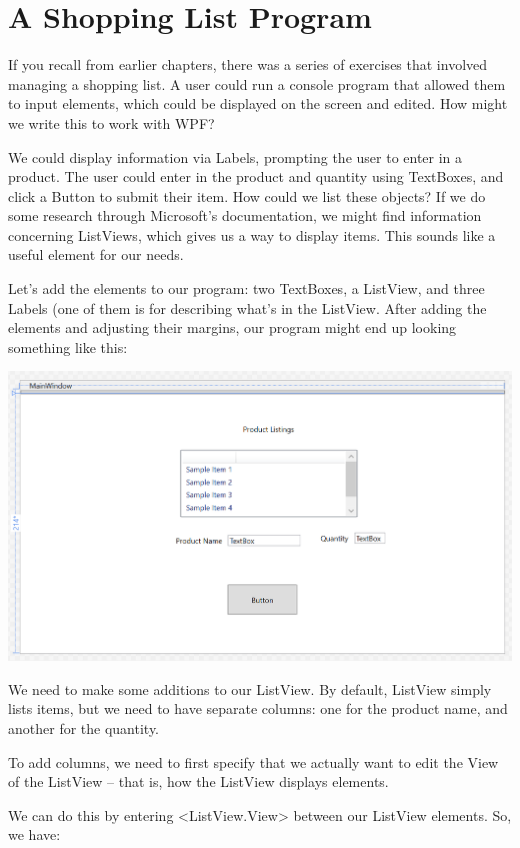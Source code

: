 \documentclass[oneside, openany] {book}
\begin{document}
\section{A Shopping List Program}
If you recall from earlier chapters, there was a series of exercises that involved managing a shopping list. A user could run a console program that allowed them to input elements, which could be displayed on the screen and edited. How might we write this to work with WPF?

We could display information via Labels, prompting the user to enter in a product. The user could enter in the product and quantity using TextBoxes, and click a Button to submit their item. How could we list these objects? If we do some research through Microsoft's documentation, we might find information concerning ListViews, which gives us a way to display items. This sounds like a useful element for our needs.

Let's add the elements to our program: two TextBoxes, a ListView, and three Labels (one of them is for describing what's in the ListView.
After adding the elements and adjusting their margins, our program might end up looking something like this:


\includegraphics[scale=0.3]{shoppingwpfintro.png}



We need to make some additions to our ListView. By default, ListView simply lists items, but we need to have separate columns: one for the product name, and another for the quantity.

To add columns, we need to first specify that we actually want to edit the View of the ListView -- that is, how the ListView displays elements.

We can do this by entering <ListView.View> between our ListView elements. So, we have:
\end{document}
